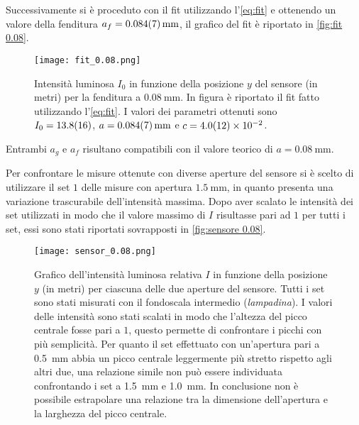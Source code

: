 \documentclass[../main.tex]{subfiles}
\begin{document}
\newpage

Successivamente si è proceduto con il fit utilizzando l'\autoref{eq:fit} e ottenendo un valore della fenditura $a_f = \qty{0.084+-0.007}{\mm}$, il grafico del fit è riportato in \autoref{fig:fit 0.08}.

\begin{figure}[ht!]
    \centering
    \texttt{[image: fit\_0.08.png]}
    \caption{Intensità luminosa $I_{0}$ in funzione della posizione $y$ del sensore (in metri) per la fenditura a $\qty{0.08}{\mm}$. In figura è riportato il fit fatto utilizzando l'\autoref{eq:fit}. I valori dei parametri ottenuti sono $I_{0} = \num{13.8+-1.6}$, $a = \qty{0.084+-0.007}{\mm}$ e $c = \num{4+-1.2e-2}$.}
    \label{fig:fit 0.08}
\end{figure}

Entrambi $a_g$ e $a_f$ risultano compatibili con il valore teorico di $a = \qty{0.08}{\mm}$.

Per confrontare le misure ottenute con diverse aperture del sensore si è scelto di utilizzare il set $1$ delle misure con apertura $\qty{1.5}{\mm}$, in quanto presenta una variazione trascurabile dell'intensità massima. %
Dopo aver scalato le intensità dei set utilizzati in modo che il valore massimo di $I$ risultasse pari ad $1$ per tutti i set, essi sono stati riportati sovrapposti in \autoref{fig:sensore 0.08}.

\begin{figure}[ht!]
    \centering
    \texttt{[image: sensor\_0.08.png]}
    \caption{Grafico dell'intensità luminosa relativa $I$ in funzione della posizione $y$ (in metri) per ciascuna delle due aperture del sensore.
        Tutti i set sono stati misurati con il fondoscala intermedio (\textit{lampadina}). I valori delle intensità sono stati scalati in modo che l'altezza del picco centrale fosse pari a $1$, questo permette di confrontare i picchi con più semplicità.
        Per quanto il set effettuato con un'apertura pari a \qty{0.5}{\mm} abbia un picco centrale leggermente più stretto rispetto agli altri due, una relazione simile non può essere individuata confrontando i set a \qty{1.5}{\mm} e \qty{1.0}{\mm}. In conclusione non è possibile estrapolare una relazione tra la dimensione dell'apertura e la larghezza del picco centrale.}
    \label{fig:sensore 0.08}
\end{figure}
\end{document}
